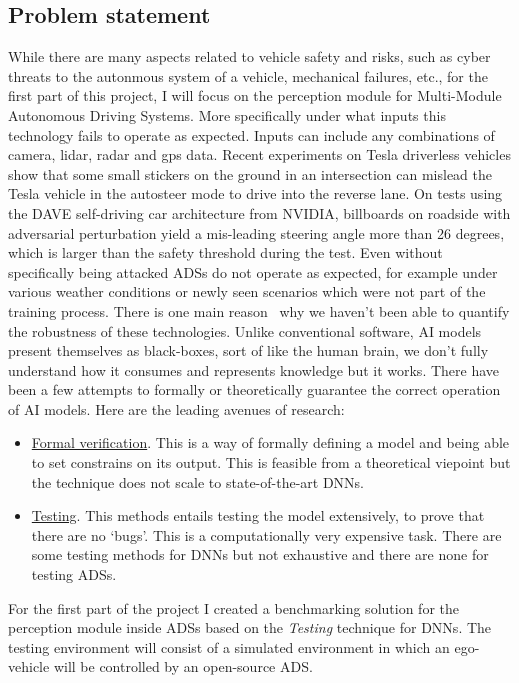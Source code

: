 \documentclass[a4paper]{article}
\begin{document}
  \subsection{Problem statement}
  While there are many aspects related to vehicle safety and risks, such as cyber threats to the autonmous system of a vehicle, mechanical failures, etc., for the first part of this project, I will focus on the perception module for Multi-Module Autonomous Driving Systems. More specifically under what inputs this technology fails to operate as expected. Inputs can include any combinations of camera, lidar, radar and gps data. 
  Recent experiments on Tesla driverless vehicles show that some small stickers on the ground in an intersection can mislead the Tesla vehicle in the autosteer mode to drive into the reverse lane. On tests using the DAVE self-driving car architecture from NVIDIA, billboards on roadside with adversarial perturbation yield a mis-leading steering angle more than 26 degrees, which is larger than the safety threshold during the test. Even without specifically being attacked ADSs do not operate as expected, for example under various weather conditions or newly seen scenarios which were not part of the training process.
  There is one main reason~\cite{huang2020survey} why we haven't been able to quantify the robustness of these technologies. Unlike conventional software, AI models present themselves as black-boxes, sort of like the human brain, we don't fully understand how it consumes and represents knowledge but it works. There have been a few attempts to formally or theoretically guarantee the correct operation of AI models. Here are the leading avenues of research: 
  \begin{itemize}
    \item \underline{Formal verification}. This is a way of formally defining a model and being able to set constrains on its output. This is feasible from a theoretical viepoint but the technique does not scale to state-of-the-art DNNs.
    \item \underline{Testing}. This methods entails testing the model extensively, to prove that there are no `bugs'. This is a computationally very expensive task. There are some testing methods for DNNs but not exhaustive and there are none for testing ADSs.
  \end{itemize}

  For the first part of the project I created a benchmarking solution for the perception module inside ADSs based on the \emph{Testing} technique for DNNs. The testing environment will consist of a simulated environment in which an ego-vehicle will be controlled by an open-source ADS\@.
\end{document}
